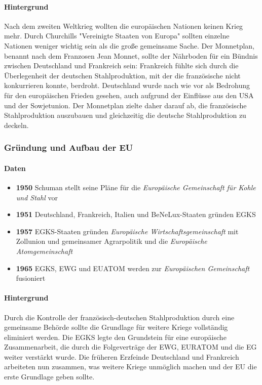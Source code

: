 \documentclass{article}
\begin{document}
	\paragraph{Hintergrund}
	Nach dem zweiten Weltkrieg wollten die europäischen Nationen keinen Krieg mehr. Durch Churchills "Vereinigte Staaten von Europa" sollten einzelne Nationen weniger wichtig sein als die große gemeinsame Sache. Der Monnetplan, benannt nach dem Franzosen Jean Monnet, sollte der Nährboden für ein Bündnis zwischen Deutschland und Frankreich sein: Frankreich fühlte sich durch die Überlegenheit der deutschen Stahlproduktion, mit der die französische nicht konkurrieren konnte, berdroht. Deutschland wurde nach wie vor als Bedrohung für den europäischen Frieden gesehen, auch aufgrund der Einflüsse aus den USA und der Sowjetunion. Der Monnetplan zielte daher darauf ab, die französische Stahlproduktion auszubauen und gleichzeitig die deutsche Stahlproduktion zu deckeln. 

	\subsubsection{Gründung und Aufbau der EU}
	\paragraph{Daten}
	\begin{itemize}
		\item \textbf{1950} Schuman stellt seine Pläne für die \textit{Europäische Gemeinschaft für Kohle und Stahl} vor
		\item \textbf{1951} Deutschland, Frankreich, Italien und BeNeLux-Staaten gründen EGKS
		\item \textbf{1957} EGKS-Staaten gründen \textit{Europäische Wirtschaftsgemeinschaft} mit Zollunion und gemeinsamer Agrarpolitik und die \textit{Europäische Atomgemeinschaft}
		\item \textbf{1965} EGKS, EWG und EUATOM werden zur \textit{Europäischen Gemeinschaft} fusioniert
	\end{itemize}

	\paragraph{Hintergrund}
	Durch die Kontrolle der französisch-deutschen Stahlproduktion durch eine gemeinsame Behörde sollte die Grundlage für weitere Kriege vollständig eliminiert werden. Die EGKS legte den Grundstein für eine europäische Zusammenarbeit, die durch die Folgeverträge der EWG, EURATOM und die EG weiter verstärkt wurde. Die früheren Erzfeinde Deutschland und Frankreich arbeiteten nun zusammen, was weitere Kriege unmöglich machen und der EU die erste Grundlage geben sollte.
\end{document}
